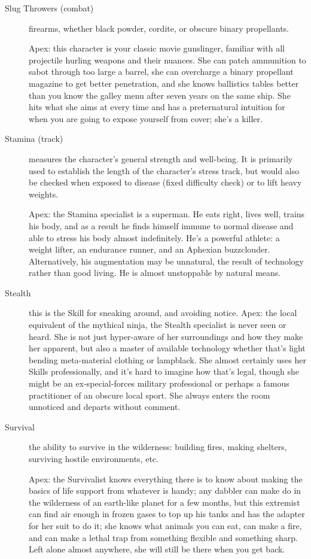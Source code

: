 \begin{description}
\item[Slug Throwers (combat)]
firearms, whether black powder, cordite, or obscure binary propellants.

Apex: this character is your classic movie gunslinger, familiar with all projectile hurling weapons and their nuances. She can patch ammunition to sabot through too large a barrel, she can overcharge a binary propellant magazine to get better penetration, and she knows ballistics tables better than you know the galley menu after seven years on the same ship. She hits what she aims at every time and has a preternatural intuition for when you are going to expose yourself from cover; she's a killer.

\item[Stamina (track)]
measures the character's general strength and well-being. It is primarily used to establish the length of the character's \Health{} stress track, but would also be checked when exposed to disease (fixed difficulty check) or to lift heavy weights.

Apex: the Stamina specialist is a superman. He eats right, lives well, trains his body, and as a result he finds himself immune to normal disease and able to stress his body almost indefinitely. He's a powerful athlete: a weight lifter, an endurance runner, and an Aphexian buzzclouder. Alternatively, his augmentation may be unnatural, the result of technology rather than good living. He is almost unstoppable by natural means.

\item[Stealth]
this is the Skill for sneaking around, and avoiding notice. Apex: the local equivalent of the mythical ninja, the Stealth specialist is never seen or heard. She is not just hyper-aware of her surroundings and how they make her apparent, but also a master of available technology whether that's light bending meta-material clothing or lampblack. She almost certainly uses her Skills professionally, and it's hard to imagine how that's legal, though she might be an ex-special-forces military professional or perhaps a famous practitioner of an obscure local sport. She always enters the room unnoticed and departs without comment.

\item[Survival]
the ability to survive in the wilderness: building fires, making shelters, surviving hostile environments, etc.

Apex: the Survivalist knows everything there is to know about making the basics of life support from whatever is handy; any dabbler can make do in the wilderness of an earth-like planet for a few months, but this extremist can find air enough in frozen gases to top up his tanks and has the adapter for her suit to do it; she knows what animals you can eat, can make a fire, and can make a lethal trap from something flexible and something sharp. Left alone almost anywhere, she will still be there when you get back.


\end{description}
